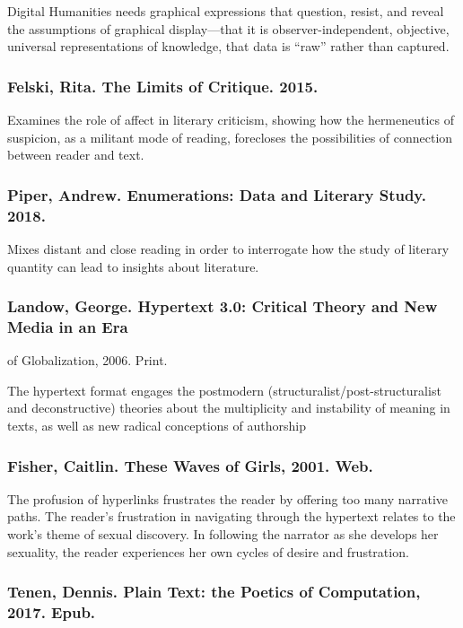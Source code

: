 \documentclass[11pt]{article}
\begin{document}
Digital Humanities needs graphical expressions that question, resist,
and reveal the assumptions of graphical display---that it is
observer-independent, objective, universal representations of
knowledge, that data is “raw” rather than captured.

\subsubsection{Felski, Rita. The Limits of Critique. 2015.}
\label{sec:orgc813fa9}

Examines the role of affect in literary criticism, showing how the
hermeneutics of suspicion, as a militant mode of reading, forecloses
the possibilities of connection between reader and text.  

\subsubsection{Piper, Andrew. Enumerations: Data and Literary Study. 2018.}
\label{sec:org405a7d0}

Mixes distant and close reading in order to interrogate how the study
of literary quantity can lead to insights about literature.

\subsubsection{Landow, George. Hypertext 3.0: Critical Theory and New Media in an Era}
\label{sec:orga2356da}
of Globalization, 2006. Print.

The hypertext format engages the postmodern
(structuralist/post-structuralist and deconstructive) theories about
the multiplicity and instability of meaning in texts, as well as new
radical conceptions of authorship

\subsubsection{Fisher, Caitlin. These Waves of Girls, 2001. Web.}
\label{sec:orgecd8c15}

The profusion of hyperlinks frustrates the reader by offering too many
narrative paths. The reader’s frustration in navigating through the
hypertext relates to the work’s theme of sexual discovery. In
following the narrator as she develops her sexuality, the reader
experiences her own cycles of desire and frustration.

\subsubsection{Tenen, Dennis. Plain Text: the Poetics of Computation, 2017. Epub.}
\label{sec:org77093f4}
\end{document}
